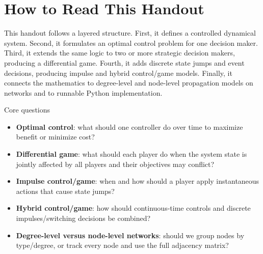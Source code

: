 \documentclass[11pt,a4paper]{article}
\begin{document}
\section{How to Read This Handout}

This handout follows a layered structure. First, it defines a controlled dynamical system. Second, it formulates an optimal control problem for one decision maker. Third, it extends the same logic to two or more strategic decision makers, producing a differential game. Fourth, it adds discrete state jumps and event decisions, producing impulse and hybrid control/game models. Finally, it connects the mathematics to degree-level and node-level propagation models on networks and to runnable Python implementation.

\begin{definitionbox}{Core questions}
\begin{itemize}
  \item \textbf{Optimal control}: what should one controller do over time to maximize benefit or minimize cost?
  \item \textbf{Differential game}: what should each player do when the system state is jointly affected by all players and their objectives may conflict?
  \item \textbf{Impulse control/game}: when and how should a player apply instantaneous actions that cause state jumps?
  \item \textbf{Hybrid control/game}: how should continuous-time controls and discrete impulses/switching decisions be combined?
  \item \textbf{Degree-level versus node-level networks}: should we group nodes by type/degree, or track every node and use the full adjacency matrix?
\end{itemize}
\end{definitionbox}
\end{document}
